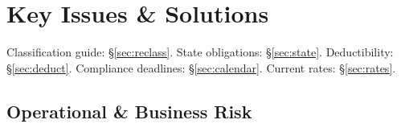 \documentclass[10pt,a4paper]{article}
\begin{document}
\clearpage
\section{Key Issues \& Solutions}
\label{sec:issues}

Classification guide: \S\ref{sec:reclass}. State obligations: \S\ref{sec:state}. Deductibility: \S\ref{sec:deduct}. Compliance deadlines: \S\ref{sec:calendar}. Current rates: \S\ref{sec:rates}.

\subsection{Operational \& Business Risk}
\label{sec:issues:ops}
\end{document}
